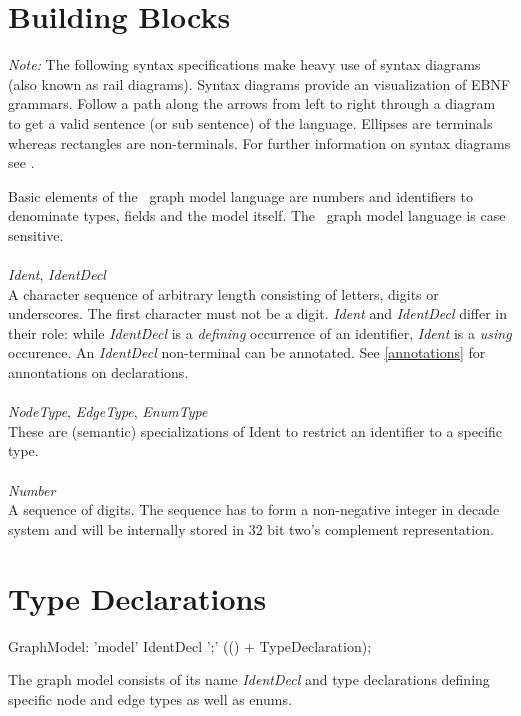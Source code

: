 \section{Building Blocks}
\label{modelbb}

\emph{Note:} The following syntax specifications make heavy use of syntax diagrams (also known as rail diagrams). Syntax diagrams provide an visualization of EBNF grammars. Follow a path along the arrows from left to right through a diagram to get a valid sentence (or sub sentence) of the language. Ellipses are terminals whereas rectangles are non-terminals. For further information on syntax diagrams see \cite{pascal}.

Basic elements of the \GrG\ graph model language are numbers and identifiers to denominate types, fields and the model itself. The \GrG\ graph model language is case sensitive.\\
\\
\emph{Ident}, \emph{IdentDecl}\\ \nopagebreak
A character sequence of arbitrary length consisting of letters, digits or underscores. The first character must not be a digit. \emph{Ident} and \emph{IdentDecl} differ in their role: while \emph{IdentDecl} is a \emph{defining} occurrence of an identifier, \emph{Ident} is a \emph{using} occurence. An \emph{IdentDecl} non-terminal can be annotated. See \ref{annotations} for annontations on declarations.\\
\\
\emph{NodeType}, \emph{EdgeType}, \emph{EnumType}\\ \nopagebreak
These are (semantic) specializations of Ident to restrict an identifier to a specific type.\\
\\
\emph{Number}\\ \nopagebreak
A sequence of digits. The sequence has to form a non-negative integer in decade system and will be internally stored in 32 bit two's complement representation.

\section{Type Declarations}
\begin{rail}
  GraphModel: 'model' IdentDecl ';' (() + TypeDeclaration);
\end{rail}
The graph model consists of its name \emph{IdentDecl} and type declarations defining specific node and edge types as well as enums.

